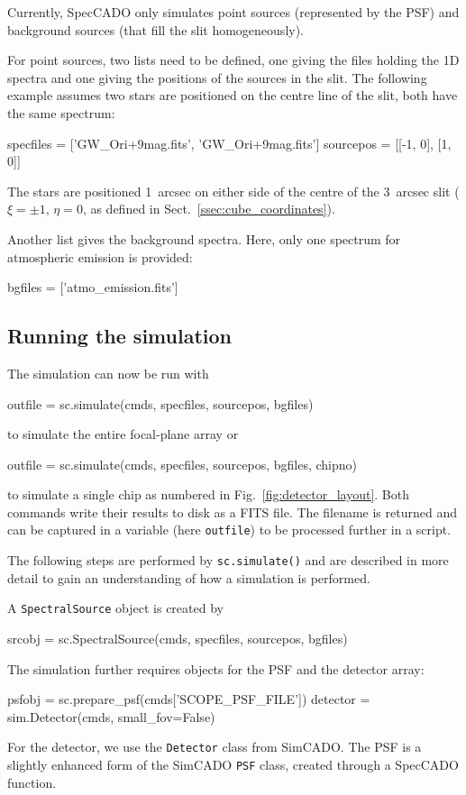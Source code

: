 \documentclass[a4paper,twoside,11pt]{article}
\begin{document}
Currently, SpecCADO only simulates point sources (represented by the
PSF) and background sources (that fill the slit homogeneously).

For point sources, two lists need to be defined, one giving the files
holding the 1D spectra and one giving the positions of the sources in
the slit. The following example assumes two stars are positioned on
the centre line of the slit, both have the same spectrum:
\begin{pyin}
specfiles = ['GW_Ori+9mag.fits', 'GW_Ori+9mag.fits']
sourcepos = [[-1, 0], [1, 0]]
\end{pyin}
The stars are positioned 1~arcsec on either side of the centre of the
3~arcsec slit ($\xi=\pm 1$, $\eta=0$, as defined in
Sect.~\ref{ssec:cube_coordinates}).

Another list gives the background spectra. Here, only one spectrum for
atmospheric emission is provided:
\begin{pyin}
bgfiles = ['atmo_emission.fits']
\end{pyin}

\subsection{Running the simulation}
\label{ssec:simulation_run}

The simulation can now be run with
\begin{pyin}
outfile = sc.simulate(cmds, specfiles, sourcepos, bgfiles)
\end{pyin}
to simulate the entire focal-plane array or
\begin{pyin}
outfile = sc.simulate(cmds, specfiles, sourcepos, bgfiles, chipno)
\end{pyin}
to simulate a single chip as numbered in
Fig.~\ref{fig:detector_layout}. Both commands write their results to
disk as a FITS file. The filename is returned and can be captured in a
variable (here \lstinline{outfile}) to be processed further in a
script.

The following steps are performed by \lstinline{sc.simulate()} and are
described in more detail to gain an understanding of how a simulation
is performed.

A \lstinline{SpectralSource} object is created by
\begin{pyin}
srcobj = sc.SpectralSource(cmds, specfiles, sourcepos, bgfiles)
\end{pyin}

The simulation further requires objects for the PSF and the detector
array:
\begin{pyin}
psfobj = sc.prepare_psf(cmds['SCOPE_PSF_FILE'])
detector = sim.Detector(cmds, small_fov=False)
\end{pyin}
For the detector, we use the \lstinline{Detector} class from
SimCADO. The PSF is a slightly enhanced form of the SimCADO
\lstinline{PSF} class, created through a SpecCADO function.
\end{document}
